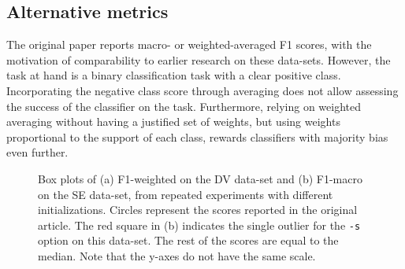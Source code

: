 \subsection{Alternative metrics}

The original paper reports macro- or weighted-averaged F1 scores, with the motivation of comparability to earlier research on these data-sets. However, the task at hand is a binary classification task with a clear positive class.
Incorporating the negative class score through averaging does not allow assessing the success of the classifier on the task. Furthermore, relying on weighted averaging without having a justified set of weights, but using weights proportional to the support of each class, rewards classifiers with majority bias even further.

\newlength{\figsize}
\setlength{\figsize}{6cm}
\begin{figure}
  \rtable
  \hfill
  \caption{\label{fig:data}Box plots of (a) F1-weighted on the DV data-set and (b) F1-macro on the SE data-set, from repeated experiments with different initializations. Circles represent the scores reported in the original article. The red square in (b) indicates the single outlier for the \texttt{-s} option on this data-set. The rest of the scores are equal to the median. Note that the y-axes do not have the same scale.
  }
\end{figure}

